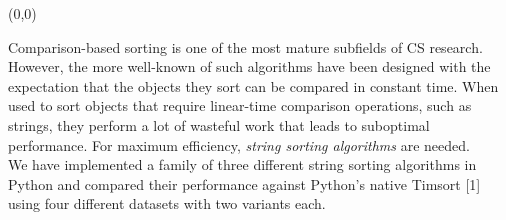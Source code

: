 \begin{textblock}{92.5}(0,0)
\begin{multicols}{2}
\sffamily
\small 
Comparison-based sorting is one of the most mature subfields of CS research.
However, the more well-known of such algorithms have been designed with the
expectation that the objects they sort can be compared in constant time.
When used to sort objects that require linear-time comparison operations,
such as strings, they perform a lot of wasteful work that leads to suboptimal
performance. For maximum efficiency, \emph{string sorting algorithms} are
needed.\\

We have implemented a family of three different string sorting algorithms in
Python and compared their performance against Python's native Timsort [1] using
four different datasets with two variants each.
\end{multicols}
\end{textblock}
